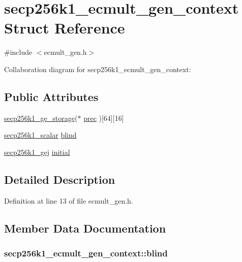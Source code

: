 \hypertarget{structsecp256k1__ecmult__gen__context}{}\section{secp256k1\+\_\+ecmult\+\_\+gen\+\_\+context Struct Reference}
\label{structsecp256k1__ecmult__gen__context}


{\ttfamily \#include $<$ecmult\+\_\+gen.\+h$>$}



Collaboration diagram for secp256k1\+\_\+ecmult\+\_\+gen\+\_\+context\+:
\subsection*{Public Attributes}
\begin{DoxyCompactItemize}
\item 
\hyperlink{structsecp256k1__ge__storage}{secp256k1\+\_\+ge\+\_\+storage}($\ast$ \hyperlink{structsecp256k1__ecmult__gen__context_ad1ebc8daeace10a8d646f89bbdf32882}{prec} )\mbox{[}64\mbox{]}\mbox{[}16\mbox{]}
\item 
\hyperlink{structsecp256k1__scalar}{secp256k1\+\_\+scalar} \hyperlink{structsecp256k1__ecmult__gen__context_af2f3064a367e86f936ab1c8b93d6f27e}{blind}
\item 
\hyperlink{structsecp256k1__gej}{secp256k1\+\_\+gej} \hyperlink{structsecp256k1__ecmult__gen__context_a1ebfe4de83e25248ea9d989d06c9b069}{initial}
\end{DoxyCompactItemize}


\subsection{Detailed Description}


Definition at line 13 of file ecmult\+\_\+gen.\+h.



\subsection{Member Data Documentation}
\hypertarget{structsecp256k1__ecmult__gen__context_af2f3064a367e86f936ab1c8b93d6f27e}{}
\subsubsection[{blind}]{ secp256k1\+\_\+ecmult\+\_\+gen\+\_\+context\+::blind}\label{structsecp256k1__ecmult__gen__context_af2f3064a367e86f936ab1c8b93d6f27e}


